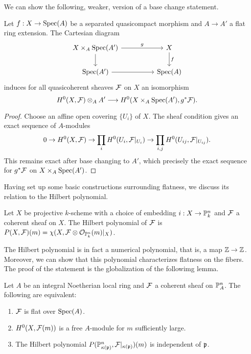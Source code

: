 We can show the following, weaker, version of a base change statement. 
\begin{proposition}\label{prop: weak flat base change}
    Let $f:X\to \operatorname{Spec}(A)$ be a separated quasicompact morphism and $A\to A'$ a flat ring extension. The Cartesian diagram 
    $$%
    \begin{tikzcd}
        {X\times_{A}\spec(A')} && X \\
        {\spec(A')} && {\spec(A)}
        \arrow["g", from=1-1, to=1-3]
        \arrow[from=1-1, to=2-1]
        \arrow["f", from=1-3, to=2-3]
        \arrow[from=2-1, to=2-3]
    \end{tikzcd}$$
    induces for all quasicoherent sheaves $\mathcal{F}$ on $X$ an isomorphism 
    $$H^{0}(X,\mathcal{F})\otimes_{A}A'\longrightarrow H^{0}(X\times_{A}\operatorname{Spec}(A'),g^{*}\mathcal{F}).$$
\end{proposition}
\begin{proof}
    Choose an affine open covering $\{U_{i}\}$ of $X$. The sheaf condition gives an exact sequence of $A$-modules
    $$0\to H^{0}(X,\mathcal{F})\to\prod_{i}H^{0}(U_{i},\mathcal{F}|_{U_{i}})\to\prod_{i,j}H^{0}(U_{ij},\mathcal{F}|_{U_{ij}}).$$
    This remains exact after base changing to $A'$, which precisely the exact sequence for $g^{*}\mathcal{F}$ on $X\times_{A}\operatorname{Spec}(A')$. 
\end{proof}
Having set up some basic constructions surrounding flatness, we discuss its relation to the Hilbert polynomial. 
\begin{definition}\label{def: hilbert polynomial}
    Let $X$ be projective $k$-scheme with a choice of embedding $i:X\to\mathbb{P}^{n}_{k}$ and $\mathcal{F}$ a coherent sheaf on $X$. The Hilbert polynomial of $\mathcal{F}$ is $P(X,\mathcal{F})(m)=\chi(X,\mathcal{F}\otimes\mathcal{O}_{\mathbb{P}^{n}_{k}}(m)|_{X})$. 
\end{definition}
The Hilbert polynomial is in fact a numerical polynomial, that is, a map $\mathbb{Z}\to\mathbb{Z}$. Moreover, we can show that this polynomial characterizes flatness on the fibers. The proof of the statement is the globalization of the followimg lemma. 
\begin{lemma}\label{lem: local constant hilbert polynomial}
    Let $A$ be an integral Noetherian local ring and $\mathcal{F}$ a coherent sheaf on $\mathbb{P}^{n}_{A}$. The following are equivalent:
    \begin{enumerate}[label=(\alph*)]
        \item $\mathcal{F}$ is flat over $\operatorname{Spec}(A)$. 
        \item $H^{0}(X,\mathcal{F}(m))$ is a free $A$-module for $m$ sufficiently large. 
        \item The Hilbert polynomial $P(\mathbb{P}^{n}_{\kappa(\mathfrak{p})},\mathcal{F}|_{\kappa(\mathfrak{p})})(m)$ is independent of $\mathfrak{p}$.
    \end{enumerate}
\end{lemma}
